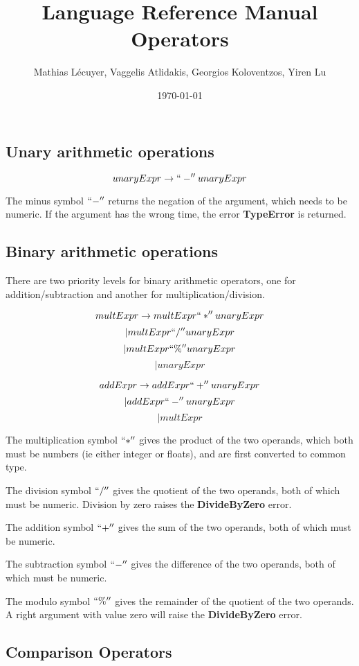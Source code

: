\documentclass[12pt]{article}
\title{Language Reference Manual Operators}
\author{Mathias Lécuyer, Vaggelis Atlidakis, Georgios Koloventzos, Yiren Lu}
\date{\today}
\begin{document}
\maketitle
\tableofcontents

\subsection{Unary arithmetic operations}

$$unaryExpr \rightarrow ``-'' unaryExpr$$

The minus symbol $``-''$ returns the negation of the argument, which needs to be numeric. If the argument has the wrong time, the error \textbf{TypeError} is returned.

\subsection{Binary arithmetic operations}

There are two priority levels for binary arithmetic operators, one for addition/subtraction and another for multiplication/division.

$$multExpr \rightarrow multExpr ``*'' unaryExpr$$
$$ \vert multExpr ``/'' unaryExpr$$
$$ \vert multExpr ``\%'' unaryExpr$$
$$ \vert unaryExpr$$

$$addExpr \rightarrow addExpr ``+'' unaryExpr $$ 
$$\vert addExpr ``-'' unaryExpr$$
$$\vert multExpr$$

The multiplication symbol $``*''$ gives the product of the two operands, which both must be numbers (ie either integer or floats), and are first converted to common type.

The division symbol $``/''$ gives the quotient of the two operands, both of which must be numeric. Division by zero raises the \textbf{DivideByZero} error.

The addition symbol $``+''$ gives the sum of the two operands, both of which must be numeric.

The subtraction symbol $``-''$ gives the difference of the two operands, both of which must be numeric.

The modulo symbol $``\%''$ gives the remainder of the quotient of the two operands. A right argument with value zero will raise the \textbf{DivideByZero} error.

\subsection{Comparison Operators}
\end{document}

